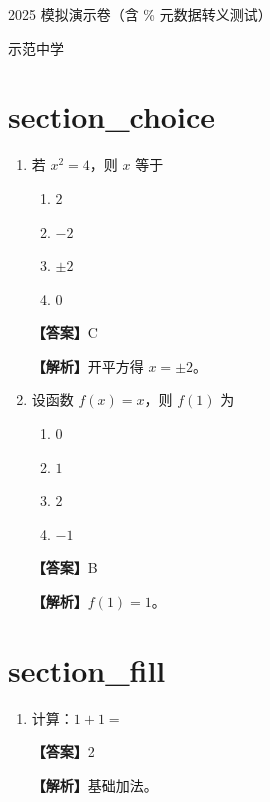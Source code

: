 \documentclass[UTF8,a4paper]{ctexart}
\begin{document}
\begin{center}
{\LARGE 2025 模拟演示卷（含 \% 元数据转义测试）\par}
\medskip
{\large 示范中学}
\end{center}
\vspace{1em}

\section*{section\_choice}
\begin{enumerate}[leftmargin=2em,itemsep=0.8em]

\item 若 $x^2=4$，则 $x$ 等于

\begin{enumerate}[label=\Alph*.,itemsep=0.2em,parsep=0pt]

\item $2$

\item $-2$

\item $\pm 2$

\item $0$

\end{enumerate}


\par\noindent\textbf{【答案】}C
\par\noindent\textbf{【解析】}开平方得 $x=\pm 2$。


\item 设函数 $f(x)=x$，则 $f(1)$ 为

\begin{enumerate}[label=\Alph*.,itemsep=0.2em,parsep=0pt]

\item $0$

\item $1$

\item $2$

\item $-1$

\end{enumerate}


\par\noindent\textbf{【答案】}B
\par\noindent\textbf{【解析】}$f(1)=1$。


\end{enumerate}
\vspace{1em}

\section*{section\_fill}
\begin{enumerate}[leftmargin=2em,itemsep=0.8em]

\item 计算：$1+1=$ \underline{\hspace{2cm}}


\par\noindent\textbf{【答案】}2
\par\noindent\textbf{【解析】}基础加法。


\end{enumerate}
\vspace{1em}
\end{document}
